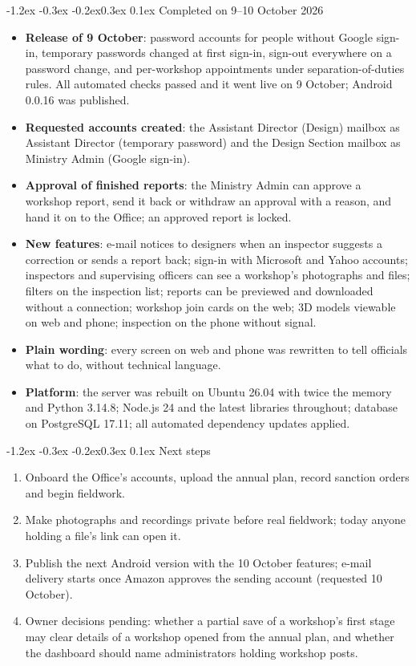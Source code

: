 \documentclass[10pt,a4paper]{article}
\makeatletter
\renewcommand\section{\@startsection{section}{1}{\z@}%
  {-1.2ex \@plus -0.3ex \@minus -0.2ex}{0.3ex \@plus 0.1ex}%
  {\normalfont\large\bfseries\color{accent}}}
\makeatother
\begin{document}
\section{Completed on 9--10 October 2026}
\begin{itemize}
\item \textbf{Release of 9 October}: password accounts for people without Google sign-in, temporary passwords
  changed at first sign-in, sign-out everywhere on a password change, and per-workshop appointments under
  separation-of-duties rules. All automated checks passed and it went live on 9 October; Android 0.0.16 was published.
\item \textbf{Requested accounts created}: the Assistant Director (Design) mailbox as Assistant Director (temporary
  password) and the Design Section mailbox as Ministry Admin (Google sign-in).
\item \textbf{Approval of finished reports}: the Ministry Admin can approve a workshop report, send it back or
  withdraw an approval with a reason, and hand it on to the Office; an approved report is locked.
\item \textbf{New features}: e-mail notices to designers when an inspector suggests a correction or sends a report back;
  sign-in with Microsoft and Yahoo accounts; inspectors and supervising officers can see a workshop's photographs
  and files; filters on the inspection list; reports can be previewed and downloaded without a connection;
  workshop join cards on the web; 3D models viewable on web and phone; inspection on the phone without signal.
\item \textbf{Plain wording}: every screen on web and phone was rewritten to tell officials what to do, without
  technical language.
\item \textbf{Platform}: the server was rebuilt on Ubuntu 26.04 with twice the memory and Python 3.14.8; Node.js 24 and
  the latest libraries throughout; database on PostgreSQL 17.11; all automated dependency updates applied.
\end{itemize}

\section{Next steps}
\begin{enumerate}[leftmargin=1.5em]
\item Onboard the Office's accounts, upload the annual plan, record sanction orders and begin fieldwork.
\item Make photographs and recordings private before real fieldwork; today anyone holding a file's link can open it.
\item Publish the next Android version with the 10 October features; e-mail delivery starts once Amazon approves
  the sending account (requested 10 October).
\item Owner decisions pending: whether a partial save of a workshop's first stage may clear details of a
  workshop opened from the annual plan, and whether the dashboard should name administrators holding
  workshop posts.
\end{enumerate}
\end{document}
